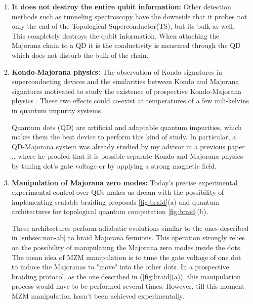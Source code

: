 \begin{enumerate}
  \item \textbf{It does not destroy the entire qubit information:} Other detection methods such as tunneling spectroscopy have the downside that it probes not only the end of the Topological Superconductor(TS), but its bulk as well. This completely destroys the qubit information. When attaching the Majorana chain to a QD it is the conductivity is measured through the QD which does not disturb the bulk of the chain. 
  \item \textbf{Kondo-Majorana physics:} The observation of Kondo signatures in superconducting devices \cite{lee_zero-bias_2012} and the similarities between Kondo and Majorana signatures \cite{vernek_subtle_2014}  motivated to study the  existence of prospective Kondo-Majorana physics \cite{lee_kondo_2013,gorski_interplay_2018}. 
  These two effects could co-exist at temperatures of a few mili-kelvins in quantum impurity systems.

   Quantum dots (QD) are artificial and adaptable quantum impurities, which makes them the best device to perform this kind of study. In particular, a QD-Majorana system was already studied by my advisor in a previous paper \citep{ruiz-tijerina_interaction_2015}., where he proofed that it is possible separate Kondo and Majorana physics by tuning dot's gate voltage or by applying a strong magnetic field. 
  \item \textbf{Manipulation of Majorana zero modes:} Today's precise experimental experimental control over QDs makes us dream with the possibility of implementing scalable braiding proposals \ref{fig:braid}(a) and  quantum architectures for topological quantum computation \ref{fig:braid}(b). 

    These architectures perform adiabatic evolutions similar to the ones described in  \ref{subsec:non-ab} to braid Majorana fermions. This operation strongly relies on the possibility of manipulating the Majorana zero modes inside the dots. The mean idea of MZM manipulation is to  tune the gate voltage of one dot to induce the Majoranas to "move" into the other dots.  In a prospective braiding protocol, as the one described in  \cite{malciu_braiding_2018} (\ref{fig:braid}(a)), this manipulation process would have to be performed several times. However, till this moment MZM manipulation hasn't been achieved experimentally. 

\end{enumerate}

